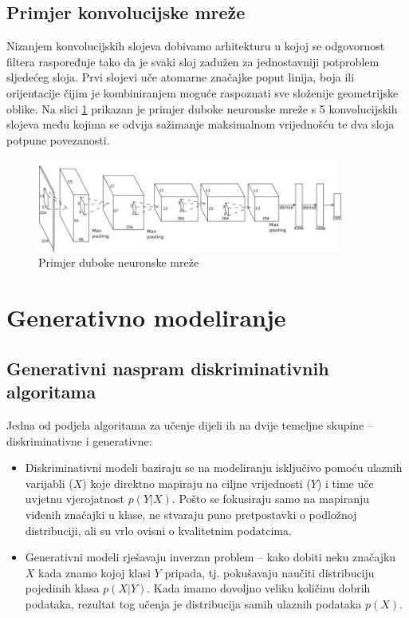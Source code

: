 \documentclass[lmodern, utf8, seminar]{fer}
\begin{document}
\section{Primjer konvolucijske mreže}
Nizanjem konvolucijskih slojeva dobivamo arhitekturu u kojoj se odgovornost filtera raspoređuje tako da je svaki sloj zadužen za jednostavniji potproblem sljedećeg sloja. Prvi slojevi uče atomarne značajke poput linija, boja ili orijentacije čijim je kombiniranjem moguće raspoznati sve složenije geometrijske oblike. Na slici \ref{fig:dnn} prikazan je primjer duboke neuronske mreže s 5 konvolucijskih slojeva među kojima se odvija sažimanje maksimalnom vrijednošću te dva sloja potpune povezanosti.
\newline

\begin{figure}[H]
    \centering
    \includegraphics[width=0.9\textwidth]{dnn}
    \caption{Primjer duboke neuronske mreže}
    \label{fig:dnn}
\end{figure}




\chapter{Generativno modeliranje}
\section{Generativni naspram diskriminativnih algoritama}
Jedna od podjela algoritama za učenje dijeli ih na dvije temeljne skupine -- diskriminativne i generativne:
\newline

\renewcommand{\labelitemi}{\textbullet}
\begin{itemize} 
\item Diskriminativni modeli baziraju se na modeliranju isključivo pomoću ulaznih varijabli ($X$) koje direktno mapiraju na ciljne vrijednosti ($Y$) i time uče uvjetnu vjerojatnost $p(Y|X)$. Pošto se fokusiraju samo na mapiranju viđenih značajki u klase, ne stvaraju puno pretpostavki o podložnoj distribuciji, ali su vrlo ovisni o kvalitetnim podatcima.

\item Generativni modeli rješavaju inverzan problem -- kako dobiti neku značajku $X$ kada znamo kojoj klasi $Y$ pripada, tj. pokušavaju naučiti distribuciju pojedinih klasa $p(X|Y)$. Kada imamo dovoljno veliku količinu dobrih podataka, rezultat tog učenja je distribucija samih ulaznih podataka $p(X)$.
\newline
\end{itemize}
\end{document}
